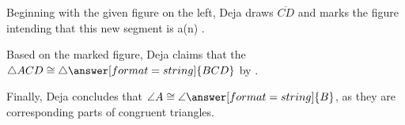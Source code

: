 \documentclass[nooutcomes]{ximera}
\begin{document}
\begin{problem}
\begin{image}
\end{image}

Beginning with the given figure on the left, Deja draws $\overline{CD}$ and marks the figure intending that this new segment is a(n) .

Based on the marked figure, Deja claims that the $\triangle ACD\cong \triangle\answer[format=string]{BCD}$ by . 

Finally, Deja concludes that $\angle A\cong \angle\answer[format=string]{B}$, as they are corresponding parts of congruent triangles. 
 

\end{problem}
\end{document}
